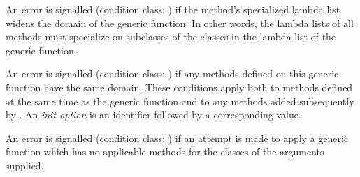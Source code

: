 \begin{optDefinition}
An error is signalled (condition class:
) if the method's specialized lambda
list widens the domain of the generic function.  In other words, the lambda
lists of all methods must specialize on subclasses of the classes in the lambda
list of the generic function.

An error is signalled (condition class:
) if any
methods defined on this generic function have the same domain.  These conditions
apply both to methods defined at the same time as the generic function and to
any methods added subsequently by .  An {\em init-option\/}
is an identifier followed by a corresponding value.

An error is signalled (condition class:
) if an
attempt is made to apply a generic function which has no applicable methods for
the classes of the arguments supplied.


\end{optDefinition}
